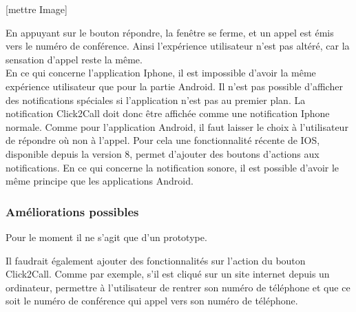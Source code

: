[mettre Image]

En appuyant sur le bouton répondre, la fenêtre se ferme, et un appel est émis vers le numéro de conférence. Ainsi l'expérience utilisateur n'est pas altéré, car la sensation d'appel reste la même.\\

En ce qui concerne l'application Iphone, il est impossible d'avoir la même expérience utilisateur que pour la partie Android. Il n'est pas possible d'afficher des notifications spéciales si l'application n'est pas au premier plan. La notification Click2Call  doit donc être affichée comme une notification Iphone normale. Comme pour l'application Android, il faut laisser le choix à l'utilisateur de répondre où non à l'appel. Pour cela une fonctionnalité récente de IOS, disponible depuis la version 8, permet d'ajouter des boutons d'actions aux notifications. En ce qui concerne la notification sonore, il est possible d'avoir le même principe que les applications Android.

\subsubsection{Améliorations possibles}

Pour le moment il ne s'agit que d'un prototype. 

Il faudrait également ajouter des fonctionnalités sur l'action du bouton Click2Call. Comme par exemple, s'il est cliqué sur un site internet depuis un ordinateur, permettre à l'utilisateur de rentrer son numéro de téléphone et que ce soit le numéro de conférence qui appel vers son numéro de téléphone.
